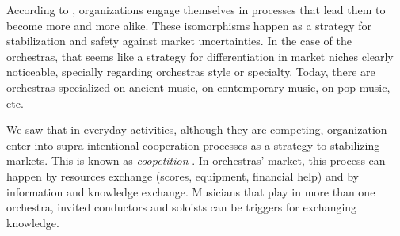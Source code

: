 \documentclass[a4paper, 12pt, openright, oneside, german, french, brazil, english, article]{abntex2}
\begin{document}
	
	According to , organizations engage themselves in processes that lead them to become more and more alike. These isomorphisms happen as a strategy for stabilization and safety against market uncertainties. In the case of the orchestras, that seems like a strategy for differentiation in market niches clearly noticeable, specially regarding orchestras style or specialty. Today, there are orchestras specialized on ancient music, on contemporary music, on pop music, etc.
	
	
	We saw that in everyday activities, although they are competing, organization enter into supra-intentional cooperation processes as a strategy to stabilizing markets. This is known as \textit{coopetition} \cite{lazega2009theorie}. In orchestras' market, this process can happen by resources exchange (scores, equipment, financial help) and by information and knowledge exchange. Musicians that play in more than one orchestra, invited conductors and soloists can be triggers for exchanging knowledge.
	
	
\end{document}
